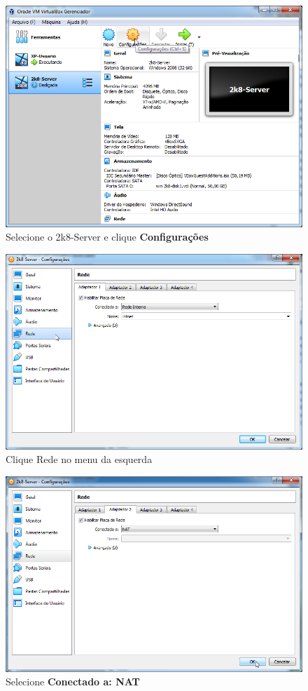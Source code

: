 \documentclass[10pt]{article}
\begin{document}
\begin{figure}[H]
    \centering
    \caption{Selecione o 2k8-Server e clique \textbf{Configurações}}
    \label{fig:re004}
    \includegraphics[width=\linewidth]{images/rede_externa/re004.png}
\end{figure}
\begin{figure}[H]
    \centering
    \caption{Clique Rede no menu da esquerda}
    \label{fig:re005}
    \includegraphics[width=\linewidth]{images/rede_externa/re005.png}
\end{figure}
\begin{figure}[H]
    \centering
    \caption{Selecione \textbf{Conectado a: NAT}}
    \label{fig:re006}
    \includegraphics[width=\linewidth]{images/rede_externa/re006.png}
\end{figure}
\end{document}
